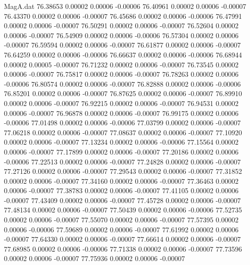 \begin{filecontents}{MagA.dat}
  76.38653    0.00002    0.00006   -0.00006
  76.40961    0.00002    0.00006   -0.00007
  76.43370    0.00002    0.00006   -0.00007
  76.45686    0.00002    0.00006   -0.00006
  76.47991    0.00002    0.00006   -0.00007
  76.50291    0.00002    0.00006   -0.00007
  76.52604    0.00002    0.00006   -0.00007
  76.54909    0.00002    0.00006   -0.00006
  76.57304    0.00002    0.00006   -0.00007
  76.59594    0.00002    0.00006   -0.00007
  76.61877    0.00002    0.00006   -0.00007
  76.64259    0.00002    0.00006   -0.00006
  76.66637    0.00002    0.00006   -0.00006
  76.68944    0.00002    0.00005   -0.00007
  76.71232    0.00002    0.00006   -0.00007
  76.73545    0.00002    0.00006   -0.00007
  76.75817    0.00002    0.00006   -0.00007
  76.78263    0.00002    0.00006   -0.00006
  76.80574    0.00002    0.00006   -0.00007
  76.82888    0.00002    0.00006   -0.00006
  76.85201    0.00002    0.00006   -0.00007
  76.87625    0.00002    0.00006   -0.00007
  76.89910    0.00002    0.00006   -0.00007
  76.92215    0.00002    0.00006   -0.00007
  76.94531    0.00002    0.00006   -0.00007
  76.96878    0.00002    0.00006   -0.00007
  76.99175    0.00002    0.00006   -0.00006
  77.01498    0.00002    0.00006   -0.00006
  77.03799    0.00002    0.00006   -0.00007
  77.06218    0.00002    0.00006   -0.00007
  77.08637    0.00002    0.00006   -0.00007
  77.10920    0.00002    0.00006   -0.00007
  77.13234    0.00002    0.00006   -0.00006
  77.15564    0.00002    0.00006   -0.00007
  77.17899    0.00002    0.00006   -0.00007
  77.20186    0.00002    0.00006   -0.00006
  77.22513    0.00002    0.00006   -0.00007
  77.24828    0.00002    0.00006   -0.00007
  77.27126    0.00002    0.00006   -0.00007
  77.29543    0.00002    0.00006   -0.00007
  77.31852    0.00002    0.00006   -0.00007
  77.34160    0.00002    0.00006   -0.00007
  77.36463    0.00002    0.00006   -0.00007
  77.38783    0.00002    0.00006   -0.00007
  77.41105    0.00002    0.00006   -0.00007
  77.43409    0.00002    0.00006   -0.00007
  77.45728    0.00002    0.00006   -0.00007
  77.48134    0.00002    0.00006   -0.00007
  77.50439    0.00002    0.00006   -0.00006
  77.52735    0.00002    0.00006   -0.00007
  77.55070    0.00002    0.00006   -0.00007
  77.57395    0.00002    0.00006   -0.00006
  77.59689    0.00002    0.00006   -0.00007
  77.61992    0.00002    0.00006   -0.00007
  77.64330    0.00002    0.00006   -0.00007
  77.66614    0.00002    0.00006   -0.00007
  77.68985    0.00002    0.00006   -0.00006
  77.71338    0.00002    0.00006   -0.00007
  77.73596    0.00002    0.00006   -0.00007
  77.75936    0.00002    0.00006   -0.00007

\end{filecontents}
